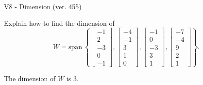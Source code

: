 \begin{exercise}
  \begin{exerciseTitle}V8 - Dimension (ver. 455)\end{exerciseTitle}
  \begin{exerciseStatement}
    Explain how to find the dimension of 
\[W=\mathrm{span}\ \left\{\left[\begin{array}{r}
-1 \\
2 \\
-3 \\
0 \\
-1
\end{array}\right] , \left[\begin{array}{r}
-4 \\
-1 \\
3 \\
1 \\
0
\end{array}\right] , \left[\begin{array}{r}
-1 \\
0 \\
-3 \\
3 \\
1
\end{array}\right] , \left[\begin{array}{r}
-7 \\
-4 \\
9 \\
2 \\
1
\end{array}\right]\right\}.\]



  \end{exerciseStatement}
  \begin{exerciseAnswer}
   The dimension of \(W\) is  \(3\).
  


  \end{exerciseAnswer}
\end{exercise}